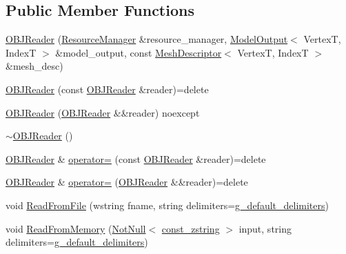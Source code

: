 \subsection*{Public Member Functions}
\begin{DoxyCompactItemize}
\item 
\mbox{\hyperlink{classmage_1_1rendering_1_1loader_1_1_o_b_j_reader_a5fe68a545e05c266b69f35e4dc9027a9}{O\+B\+J\+Reader}} (\mbox{\hyperlink{classmage_1_1rendering_1_1_resource_manager}{Resource\+Manager}} \&resource\+\_\+manager, \mbox{\hyperlink{structmage_1_1rendering_1_1_model_output}{Model\+Output}}$<$ VertexT, IndexT $>$ \&model\+\_\+output, const \mbox{\hyperlink{classmage_1_1rendering_1_1_mesh_descriptor}{Mesh\+Descriptor}}$<$ VertexT, IndexT $>$ \&mesh\+\_\+desc)
\item 
\mbox{\hyperlink{classmage_1_1rendering_1_1loader_1_1_o_b_j_reader_a1ba7402bf27180682de9109a3d0d031f}{O\+B\+J\+Reader}} (const \mbox{\hyperlink{classmage_1_1rendering_1_1loader_1_1_o_b_j_reader}{O\+B\+J\+Reader}} \&reader)=delete
\item 
\mbox{\hyperlink{classmage_1_1rendering_1_1loader_1_1_o_b_j_reader_afa0ab677916b17126aa4fc202c52684e}{O\+B\+J\+Reader}} (\mbox{\hyperlink{classmage_1_1rendering_1_1loader_1_1_o_b_j_reader}{O\+B\+J\+Reader}} \&\&reader) noexcept
\item 
\mbox{\hyperlink{classmage_1_1rendering_1_1loader_1_1_o_b_j_reader_a2b10c4cbb4c4aea192c78045beb4735e}{$\sim$\+O\+B\+J\+Reader}} ()
\item 
\mbox{\hyperlink{classmage_1_1rendering_1_1loader_1_1_o_b_j_reader}{O\+B\+J\+Reader}} \& \mbox{\hyperlink{classmage_1_1rendering_1_1loader_1_1_o_b_j_reader_a006549a7f9724580c7fdae2f7a9c7bdf}{operator=}} (const \mbox{\hyperlink{classmage_1_1rendering_1_1loader_1_1_o_b_j_reader}{O\+B\+J\+Reader}} \&reader)=delete
\item 
\mbox{\hyperlink{classmage_1_1rendering_1_1loader_1_1_o_b_j_reader}{O\+B\+J\+Reader}} \& \mbox{\hyperlink{classmage_1_1rendering_1_1loader_1_1_o_b_j_reader_ad35fe46e20179ce1cd79386501ee0959}{operator=}} (\mbox{\hyperlink{classmage_1_1rendering_1_1loader_1_1_o_b_j_reader}{O\+B\+J\+Reader}} \&\&reader)=delete
\item 
void \mbox{\hyperlink{classmage_1_1rendering_1_1loader_1_1_o_b_j_reader_a6ee0c53351656ac4cd92db1d7c372cff}{Read\+From\+File}} (wstring fname, string delimiters=\mbox{\hyperlink{namespacemage_aa161198415efd9349da6187663250aea}{g\+\_\+default\+\_\+delimiters}})
\item 
void \mbox{\hyperlink{classmage_1_1rendering_1_1loader_1_1_o_b_j_reader_a5aa9068792817b6d6dc840a44b788159}{Read\+From\+Memory}} (\mbox{\hyperlink{namespacemage_a8769f9d670d6b585ea306cb1062af94b}{Not\+Null}}$<$ \mbox{\hyperlink{namespacemage_abfd9206dc607ceb5d13ec68bf075a5c0}{const\+\_\+zstring}} $>$ input, string delimiters=\mbox{\hyperlink{namespacemage_aa161198415efd9349da6187663250aea}{g\+\_\+default\+\_\+delimiters}})

\end{DoxyCompactItemize}
